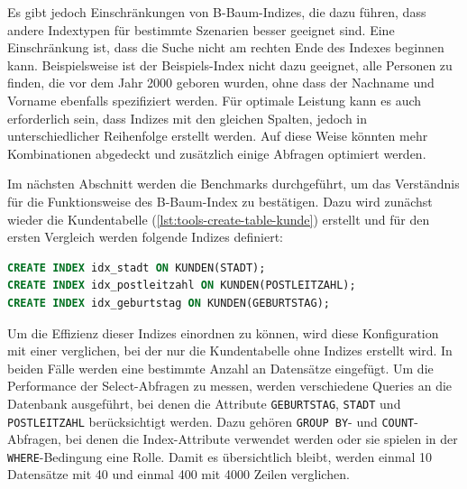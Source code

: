 Es gibt jedoch Einschränkungen von B-Baum-Indizes, die dazu führen, dass andere Indextypen für bestimmte Szenarien besser geeignet sind.
Eine Einschränkung ist, dass die Suche nicht am rechten Ende des Indexes beginnen kann.
Beispielsweise ist der Beispiels-Index nicht dazu geeignet, alle Personen zu finden, die vor dem Jahr 2000 geboren wurden, ohne dass der Nachname und Vorname ebenfalls spezifiziert werden.
Für optimale Leistung kann es auch erforderlich sein, dass Indizes mit den gleichen Spalten, jedoch in unterschiedlicher Reihenfolge erstellt werden.
Auf diese Weise könnten mehr Kombinationen abgedeckt und zusätzlich einige Abfragen optimiert werden.

Im nächsten Abschnitt werden die Benchmarks durchgeführt, um das Verständnis für die Funktionsweise des B-Baum-Index zu bestätigen.
Dazu wird zunächst wieder die Kundentabelle (\ref{lst:tools-create-table-kunde}) erstellt und für den ersten Vergleich werden folgende Indizes definiert:

\vspace{-5pt}
\begin{lstlisting}[language=SQL,caption=Definition mehrere Indizes,label={lst:indexing-create-multiple}]
CREATE INDEX idx_stadt ON KUNDEN(STADT);
CREATE INDEX idx_postleitzahl ON KUNDEN(POSTLEITZAHL);
CREATE INDEX idx_geburtstag ON KUNDEN(GEBURTSTAG);
\end{lstlisting}
\vspace{-5pt}

Um die Effizienz dieser Indizes einordnen zu können, wird diese Konfiguration mit einer verglichen, bei der nur die Kundentabelle ohne Indizes erstellt wird.
In beiden Fälle werden eine bestimmte Anzahl an Datensätze eingefügt.
Um die Performance der Select-Abfragen zu messen, werden verschiedene Queries an die Datenbank ausgeführt, bei denen die Attribute \texttt{GEBURTSTAG}, \texttt{STADT} und \texttt{POSTLEITZAHL} berücksichtigt werden.
Dazu gehören \texttt{GROUP BY}- und \texttt{COUNT}-Abfragen, bei denen die Index-Attribute verwendet werden oder sie spielen in der \texttt{WHERE}-Bedingung eine Rolle.
Damit es übersichtlich bleibt, werden einmal 10 Datensätze mit 40 und einmal 400 mit 4000 Zeilen verglichen.

